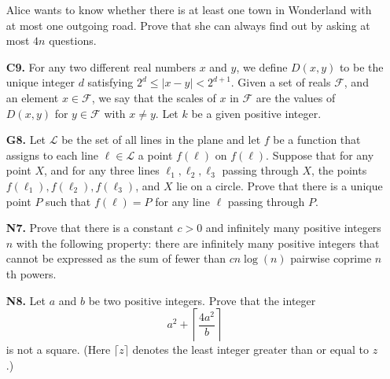 \documentclass[11pt,a4paper]{article}
\begin{document}
\begin{enumerate}
	Alice wants to know whether there is at least one town in Wonderland with at most one outgoing road. Prove that she can always find out by asking at most $4n$ questions.
	
	\item [\textbf{C9.}] For any two different real numbers $x$ and $y$, we define $D(x,y)$ to be the unique integer $d$ satisfying $2^d\le |x-y| < 2^{d+1}$. Given a set of reals $\mathcal F$, and an element $x\in \mathcal F$, we say that the scales of $x$ in $\mathcal F$ are the values of $D(x,y)$ for $y\in\mathcal F$ with $x\neq y$. Let $k$ be a given positive integer.
	
	\item [\textbf{G8.}] Let $\mathcal L$ be the set of all lines in the plane and let $f$ be a function that assigns to each line $\ell\in\mathcal L$ a point $f(\ell)$ on $f(\ell)$. Suppose that for any point $X$, and for any three lines $\ell_1,\ell_2,\ell_3$ passing through $X$, the points $f(\ell_1),f(\ell_2),f(\ell_3)$, and $X$ lie on a circle.
	Prove that there is a unique point $P$ such that $f(\ell)=P$ for any line $\ell$ passing through $P$.
	
	\item[\textbf{N7.}] Prove that there is a constant $c>0$ and infinitely many positive integers $n$ with the following property: there are infinitely many positive integers that cannot be expressed as the sum of fewer than $cn\log(n)$ pairwise coprime $n$th powers.
	
	\item[\textbf{N8.}] Let $a$ and $b$ be two positive integers. Prove that the integer
	\[a^2+\left\lceil\frac{4a^2}b\right\rceil\]is not a square. (Here $\lceil z\rceil$ denotes the least integer greater than or equal to $z$.)
	
\end{enumerate}



\newpage
\end{document}
